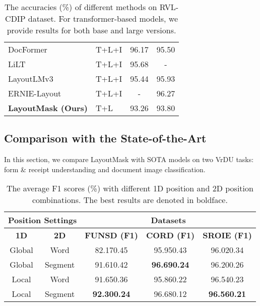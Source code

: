 \documentclass[11pt]{article}
\begin{document}
\begin{table}[]
\begin{tabular}{l|l|cc}
DocFormer  \citep{appalaraju2021docformer}               & T+L+I                     & \multicolumn{1}{c|}{96.17} & 95.50 \\
LiLT      \citep{wang2022lilt}                 & T+L+I                     & \multicolumn{1}{c|}{95.68} & -     \\
LayoutLMv3 \citep{huang2022layoutlmv3}                & T+L+I                     & \multicolumn{1}{c|}{95.44} & 95.93 \\
ERNIE-Layout      \citep{peng2022ernie}       & T+L+I                     & \multicolumn{1}{c|}{-}     & 96.27 \\ \hline
\textbf{LayoutMask (Ours)}              & T+L                       & \multicolumn{1}{c|}{93.26} & 93.80 \\ \hline
\end{tabular}
\caption{\label{table:rvlcdip-sota}
The accuracies (\%) of different methods on RVL-CDIP dataset. For transformer-based models, we provide results for both base and large versions.}
\end{table}

\subsection{Comparison with the State-of-the-Art}
In this section, we compare LayoutMask with SOTA models on two VrDU tasks: form \& receipt understanding and document image classification.
\begin{table*}[!t]
\centering
\small
\begin{tabular}{cc|ccc}
\hline
\multicolumn{2}{c|}{\textbf{Position Settings}} & \multicolumn{3}{c}{\textbf{Datasets}}               \\ \hline
\textbf{1D}        & \textbf{2D}       & \textbf{FUNSD (F1)}      & \textbf{CORD (F1)}       & \textbf{SROIE (F1)}      \\ \hline
Global                      & Word                       & 82.170.45          & 95.950.43          & 96.020.34          \\ \hline
Global                      & Segment                    & 91.610.42          & \textbf{96.690.24}          & 96.200.26          \\ \hline
Local                       & Word                       & 91.650.36          & 95.860.22          & 96.540.23          \\ \hline
Local                       & Segment                    & \textbf{92.300.24} & 96.680.12 & \textbf{96.560.21} \\ \hline
\end{tabular}
\caption{\label{ablation-on-position}
 The average F1 scores (\%) with different 1D position and 2D position combinations. The best results are denoted in boldface.
}
\end{table*}
\end{document}

